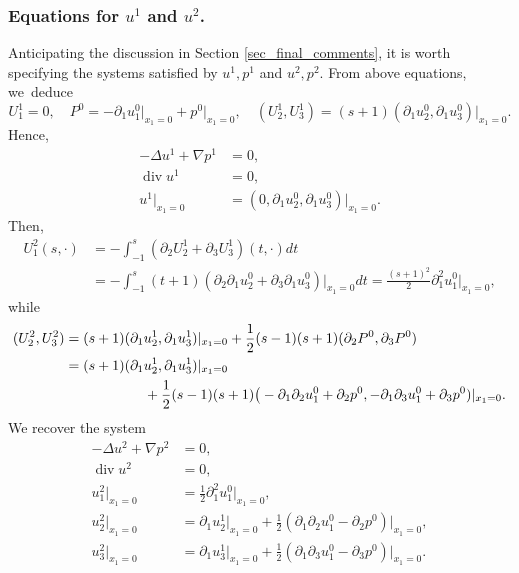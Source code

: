 \documentclass[10pt]{amsart}
\renewcommand{\div}{\operatorname{div}}
\theoremstyle{plain}
\theoremstyle{definition}
\let\pa\partial
\let\na\nabla
\begin{document}
\subsubsection*{Equations for $u^1$ and $u^2$.}
Anticipating the discussion in Section \ref{sec_final_comments}, it is worth specifying the systems satisfied by $u^1,p^1$ and $u^2,p^2$. From above equations, we~deduce
\[
U^1_1 = 0, \quad P^0 = -\pa_1 u^0_1\vert_{x_1=0} + p^0\vert_{x_1=0}, \quad (U^1_2, U^1_3) = (s+1) (\pa_1 u^0_2,\pa_1 u^0_3)\vert_{x_1=0}.
\]
Hence,
\begin{equation} \label{systemu1}
\begin{aligned}
-\Delta u^1 + \na p^1 & = 0, \\
\div u^1 & = 0, \\
u^1\vert_{x_1=0} & = (0,\pa_1 u^0_2, \pa_1 u^0_3)\vert_{x_1=0}.
\end{aligned}
\end{equation}
Then,
\begin{align*}
U^2_1(s,\cdot) &= - \int_{-1}^s (\pa_2 U^{1}_2 + \pa_3 U^{1}_3)(t,\cdot) dt \\
& = - \int_{-1}^s (t+1)(\pa_2 \pa_1 u^0_2 + \pa_3 \pa_1 u^0_3)\vert_{x_1=0}dt = \frac{(s+1)^2}{2} \pa^2_1 u^0_1\vert_{x_1=0},
\end{align*}
while
\begin{align*}
(U^2_2, U^2_3)&= (s+1) (\pa_1 u^1_2, \pa_1 u^1_3)\vert_{x_1=0} + \frac{1}{2} (s-1) (s+1) (\pa_2 P^0, \pa_3 P^0) \\
& = (s+1) (\pa_1 u^1_2, \pa_1 u^1_3)\vert_{x_1=0}\\
&\hspace*{2cm} + \frac{1}{2} (s-1) (s+1) \big(-\pa_1\pa_2 u^0_1 + \pa_2 p^0, -\pa_1\pa_3 u^0_1 + \pa_3 p^0)\vert_{x_1=0}.
\end{align*}
We recover the system
\begin{equation} \label{systemu2}
\begin{aligned}
-\Delta u^2 + \na p^2 & = 0, \\
\div u^2 & = 0, \\
u^2_1\vert_{x_1=0} & = \frac{1}{2}\pa^2_1 u^0_1\vert_{x_1=0}, \\
u^2_2\vert_{x_1=0} & = \pa_1 u^1_2\vert_{x_1=0} + \frac{1}{2}(\pa_1\pa_2 u^0_1 - \pa_2 p^0)\vert_{x_1=0},\\
u^2_3\vert_{x_1=0} & = \pa_1 u^1_3\vert_{x_1=0} + \frac{1}{2}(\pa_1\pa_3 u^0_1 - \pa_3 p^0)\vert_{x_1=0}.
\end{aligned}
\end{equation}
\end{document}

